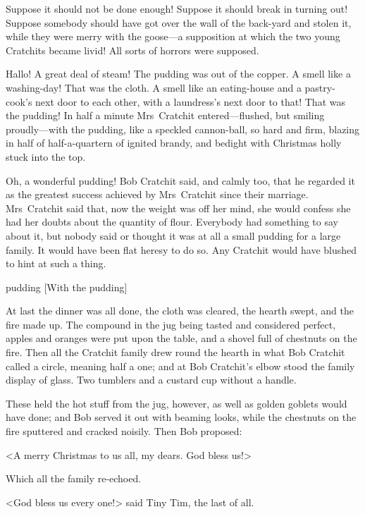 Suppose it should not be done enough! Suppose it should break in turning out! Suppose somebody should have got over the wall of the back-yard and stolen it, while they were merry with the goose—a supposition at which the two young Cratchits became livid! All sorts of horrors were supposed.

Hallo! A great deal of steam! The pudding was out of the copper. A smell like a washing-day! That was the cloth. A smell like an eating-house and a pastry-cook's next door to each other, with a laundress's next door to that! That was the pudding! In half a minute Mrs~Cratchit entered—flushed, but smiling proudly—with the pudding, like a speckled cannon-ball, so hard and firm, blazing in half of half-a-quartern of ignited brandy, and bedight with Christmas holly stuck into the top.

Oh, a wonderful pudding! Bob Cratchit said, and calmly too, that he regarded it as the greatest success achieved by Mrs~Cratchit since their marriage. Mrs~Cratchit said that, now the weight was off her mind, she would confess she had her doubts about the quantity of flour. Everybody had something to say about it, but nobody said or thought it was at all a small pudding for a large family. It would have been flat heresy to do so. Any Cratchit would have blushed to hint at such a thing.

\begin{bwbigpic}
	[\basicscale]
	{pudding}
	[With the pudding]
\end{bwbigpic}


At last the dinner was all done, the cloth was cleared, the hearth swept, and the fire made up. The compound in the jug being tasted and considered perfect, apples and oranges were put upon the table, and a shovel full of chestnuts on the fire. Then all the Cratchit family drew round the hearth in what Bob Cratchit called a circle, meaning half a one; and at Bob Cratchit's elbow stood the family display of glass. Two tumblers and a custard cup without a handle.

These held the hot stuff from the jug, however, as well as golden goblets would have done; and Bob served it out with beaming looks, while the chestnuts on the fire sputtered and cracked noisily. Then Bob proposed:

<A merry Christmas to us all, my dears. God bless us!>

Which all the family re-echoed.

<God bless us every one!> said Tiny Tim, the last of all.

